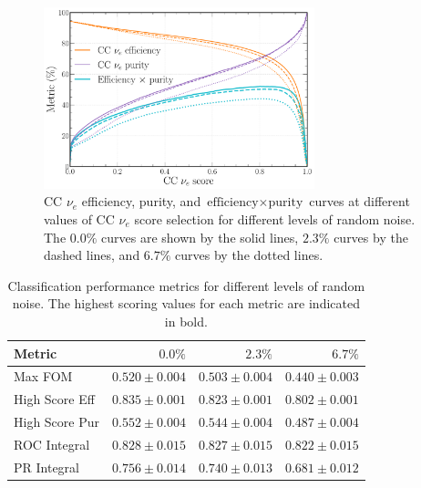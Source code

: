 \begin{figure} %
    \includegraphics[width=0.7\textwidth]{diagrams/7-results/calib_noise_nuel_eff_curves.pdf}
    \caption[CC $\nu_{e}$ efficiency and purity curves for different levels of random noise]
    {CC $\nu_{e}$ efficiency, purity, and $\text{efficiency}\times\text{purity}$ curves at
        different values of CC $\nu_{e}$ score selection for different levels of random noise. The
        $0.0\%$ curves are shown by the solid lines, $2.3\%$ curves by the dashed lines, and
        $6.7\%$ curves by the dotted lines.}
    \label{fig:calib_noise_nuel_eff_curves}
\end{figure}

\begin{table} %
    \begin{tabular}{lrrr}
        Metric         & $0.0\%$        & $2.3\%$ & $6.7\%$ \\
        \midrule
        Max FOM        & \textbf{$0.520\pm0.004$} & $0.503\pm0.004$ & $0.440\pm0.003$ \\
        High Score Eff & \textbf{$0.835\pm0.001$} & $0.823\pm0.001$ & $0.802\pm0.001$ \\
        High Score Pur & \textbf{$0.552\pm0.004$} & $0.544\pm0.004$ & $0.487\pm0.004$ \\
        ROC Integral   & \textbf{$0.828\pm0.015$} & $0.827\pm0.015$ & $0.822\pm0.015$ \\
        PR Integral    & \textbf{$0.756\pm0.014$} & $0.740\pm0.013$ & $0.681\pm0.012$ \\
    \end{tabular}
    \caption[Classification performance metrics for different levels of random noise]
    {Classification performance metrics for different levels of random noise. The highest scoring
        values for each metric are indicated in bold.}
    \label{tab:calib_noise}
\end{table}


